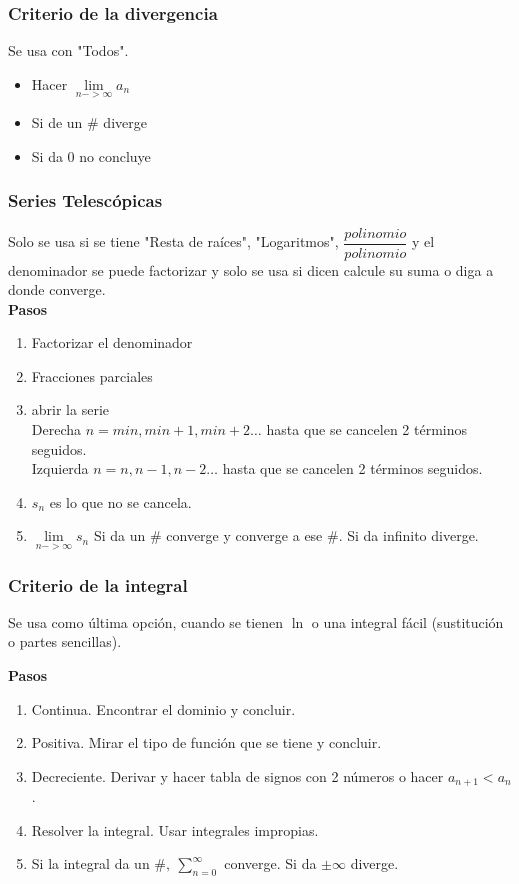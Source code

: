 \subsubsection{Criterio de la divergencia}
Se usa con "Todos".

\begin{itemize}
	\item Hacer $\lim\limits_{n -> \infty} a_n$
	\item Si de un $\#$ diverge
	\item Si da 0 no concluye
\end{itemize}
\subsubsection{Series Telescópicas}
Solo se usa si se tiene "Resta de raíces", "Logaritmos", $\dfrac{polinomio}{polinomio}$  y el denominador se puede factorizar y solo se usa si dicen calcule su suma o diga a donde converge.\\
\textbf{Pasos}
\begin{enumerate}
	\item Factorizar el denominador
	\item Fracciones parciales
	\item abrir la serie\\
	Derecha $n=min, min+1, min+2\dots$ hasta que se cancelen 2 términos seguidos.\\
	Izquierda $n=n, n-1, n-2\dots$ hasta que se cancelen 2 términos seguidos.
	\item $s_n$ es lo que no se cancela.
	\item $\lim\limits_{n -> \infty} s_n$ Si da un $\#$ converge y converge a ese $\#$. Si da infinito diverge.
\end{enumerate}
\subsubsection{Criterio de la integral}
Se usa como última opción, cuando se tienen $\ln$ o una integral fácil (sustitución o partes sencillas).

\textbf{Pasos}
\begin{enumerate}
	\item Continua. Encontrar el dominio y concluir.
	\item Positiva. Mirar el tipo de función que se tiene y concluir.
	\item Decreciente. Derivar y hacer tabla de signos con 2 números o hacer $a_{n+1}<a_n$.
	\item Resolver la integral. Usar integrales impropias.
	\item Si la integral da un $\#,\ \sum_{n=0}^{\infty}$ converge. Si da $\pm\infty$ diverge.
\end{enumerate}
